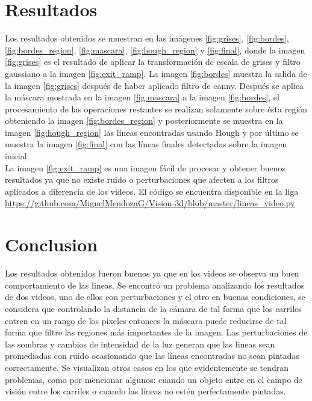 \documentclass[10pt]{IEEEtran}
\begin{document}
\section{Resultados}
Los resultados obtenidos se muestran en las imágenes \ref{fig:grises}, \ref{fig:bordes}, \ref{fig:bordes_region}, \ref{fig:mascara}, \ref{fig:hough_region} y \ref{fig:final}, donde la imagen \ref{fig:grises} es el resultado de aplicar la transformación de escala de grises y filtro gaussiano a la imagen \ref{fig:exit_ramp}. La imagen \ref{fig:bordes} muestra la salida de la imagen \ref{fig:grises} después de haber aplicado filtro de canny. Después se aplica la máscara mostrada en la imagen \ref{fig:mascara} a la imagen \ref{fig:bordes}, el procesamiento de las operaciones restantes se realizan solamente sobre ésta región obteniendo la imagen \ref{fig:bordes_region} y posteriormente se muestra en la imagen \ref{fig:hough_region} las líneas encontradas usando Hough y por último se muestra la imagen \ref{fig:final} con las líneas finales detectadas sobre la imagen inicial.\\
La imagen \ref{fig:exit_ramp} es una imagen fácil de procesar y obtener buenos resultados ya que no existe ruido o perturbaciones que afecten a los filtros aplicados a diferencia de los videos. El código se encuentra disponible en la liga \url{https://github.com/MiguelMendozaG/Vision-3d/blob/master/lineas_video.py}


\section{Conclusion}
Los resultados obtenidos fueron buenos ya que en los videos se observa un buen comportamiento de las lineas. Se encontró un problema analizando los resultados de dos videos, uno de ellos con perturbaciones y el otro en buenas condiciones, se considera que controlando la distancia de la cámara de tal forma que los carriles entren en un rango de los pixeles entonces la máscara puede reducirse de tal forma que filtre las regiones más importantes de la imagen. Las perturbaciones de las sombras y cambios de intensidad de la luz generan que las lineas sean promediadas con ruido ocasionando que las líneas encontradas no sean pintadas correctamente. Se visualizan otros casos en los que evidentemente se tendran problemas, como por mencionar algunos: cuando un objeto entre en el campo de visión entre los carriles o cuando las líneas no estén perfectamente pintadas.
\end{document}
